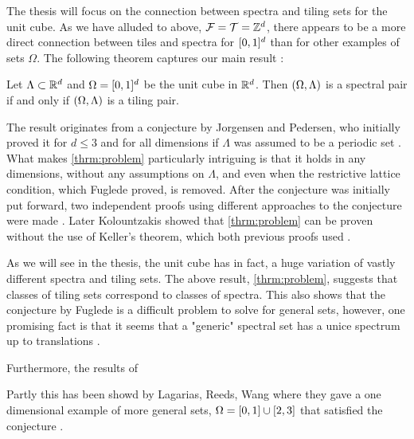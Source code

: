 \documentclass[../thesis.tex]{subfiles}
\begin{document}
The thesis will focus on the connection between spectra and tiling sets for the unit cube. As we have alluded to above, $\mathcal{F}=\mathcal{T}=\mathbb{Z}^d$, there appears to be a more direct connection between tiles and spectra for $[0,1]^d$ than for other examples of sets $\Omega$. The following theorem captures our main result \cite{iosevichSpectralTilingProperties1998}:
\begin{theorem}\label{thrm:problem}
    Let $\Lambda\subset \mathbb{R}^d$ and $\Omega=[0,1]^d$ be the unit cube in $\mathbb{R}^d$. Then $(\Omega,\Lambda)$ is a spectral pair if and only if $(\Omega,\Lambda)$ is a tiling pair.
\end{theorem}

The result originates from a conjecture by Jorgensen and Pedersen, who initially proved it for $d\leq3$ and for all dimensions if $\Lambda$ was assumed to be a periodic set \cite{jorgensenSpectralPairsCartesian2001}. What makes \cref{thrm:problem} particularly intriguing is that it holds in any dimensions, without any assumptions on $\Lambda$, and even when the restrictive lattice condition, which Fuglede proved, is removed. After the conjecture was initially put forward, two independent proofs using different approaches to the conjecture were made \cite{lagariasOrthonormalBasesExponentials2000,iosevichSpectralTilingProperties1998}. Later Kolountzakis showed that \cref{thrm:problem} can be proven without the use of Keller's theorem, which both previous proofs used \cite{kolountzakisPackingTilingOrthogonality2000}. 

As we will see in the thesis, the unit cube has in fact, a huge variation of vastly different spectra and tiling sets. 
The above result, \cref{thrm:problem}, suggests that classes of tiling sets correspond to classes of spectra. This also shows that the conjecture by Fuglede is a difficult problem to solve for general sets, however, one promising fact is that it seems that a "generic" spectral set has a unice spectrum up to translations \cite{lagariasOrthonormalBasesExponentials2000}. 

Furthermore, the results of 

Partly this has been showd by Lagarias, Reeds, Wang where they gave a one dimensional example of more general sets, $\Omega=[0,1]\cup [2,3]$  that satisfied the conjecture \cite{lagariasOrthonormalBasesExponentials2000}.
\end{document}
